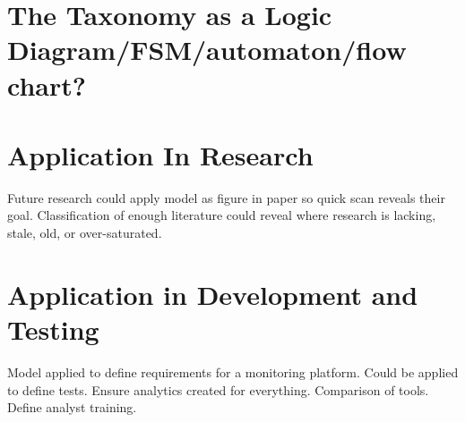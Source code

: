 \documentclass[conference]{IEEEtran}
\begin{document}
\section{The Taxonomy as a Logic Diagram/FSM/automaton/flow chart?}
\section{Application In Research}
Future research could apply model as figure in paper so quick scan reveals their goal. Classification of enough literature could reveal where research is lacking, stale, old, or over-saturated. 
\section{Application in Development and Testing}
Model applied to define requirements for a monitoring platform. Could be applied to define tests. Ensure analytics created for everything. Comparison of tools. Define analyst training.

\nocite{*}


\end{document}
